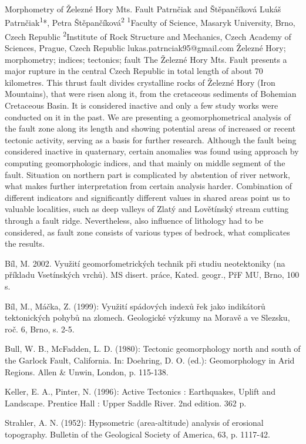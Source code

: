 \abstract
{Morphometry of Železné Hory Mts. Fault} 
{Patrnčiak and Štěpančíková} 
{Lukáš Patrnčiak\textsuperscript{1}*, Petra Štěpančíková\textsuperscript{2}} 
{\POtag} 
{
	\textsuperscript{1}Faculty of Science, Masaryk University, Brno, Czech Republic
	\textsuperscript{2}Institute of Rock Structure and Mechanics, Czech Academy of Sciences, Prague, Czech Republic
}
{lukas.patrnciak95@gmail.com}  %
{Železné Hory; morphometry; indices; tectonics; fault}
{
The Železné Hory Mts. Fault presents a major rupture in the central Czech Republic in total length of about 70 kilometres. This thrust fault divides crystalline rocks of Železné Hory (Iron Mountains), that were risen along it, from the cretaceous sediments of Bohemian Cretaceous Basin. It is considered inactive and only a few study works were conducted on it in the past. We are presenting a geomorphometrical analysis of the fault zone along its length and showing potential areas of increased or recent tectonic activity, serving as a basis for further research. Although the fault being considered inactive in quaternary, certain anomalies was found using approach by computing geomorphologic indices, and that mainly on middle segment of the fault. Situation on northern part is complicated by abstention of river network, what makes further interpretation from certain analysis harder. Combination of different indicators and significantly different values in shared areas point us to valuable localities, such as deep valleys of Zlatý and Lovětínský stream cutting through a fault ridge. Nevertheless, also influence of lithology had to be considered, as fault zone consists of various types of bedrock, what complicates the results.
}
{
Bíl, M. 2002. Využití geomorfometrických technik při studiu neotektoniky (na příkladu Vsetínských vrchů). MS disert. práce, Kated. geogr., PřF MU, Brno, 100 s. 

Bíl, M., Máčka, Z. (1999): Využití spádových indexů řek jako indikátorů tektonických pohybů na zlomech. Geologické výzkumy na Moravě a ve Slezsku, roč. 6, Brno, s. 2-5.

Bull, W. B., McFadden, L. D. (1980): Tectonic geomorphology north and south of the Garlock Fault, California. In: Doehring, D. O. (ed.): Geomorphology in Arid Regions. Allen \& Unwin, London, p. 115-138.

Keller, E. A., Pinter, N. (1996): Active Tectonics : Earthquakes, Uplift and Landscape. Prentice Hall : Upper Saddle River. 2nd edition. 362 p.

Strahler, A. N. (1952): Hypsometric (area-altitude) analysis of erosional topography. Bulletin of the Geological Society of America, 63, p. 1117-42.
}


